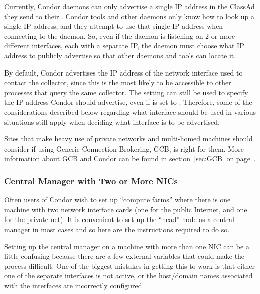 \begin{description}
  Currently, Condor daemons can only advertise a single IP address in
  the ClassAd they send to their .
  Condor tools and other daemons only know how to look up a single IP
  address, and they attempt to use that single IP address
  when connecting to the daemon.
  So, even if the daemon is listening on 2 or more different interfaces,
  each with a separate IP, the daemon must choose what IP address to
  publicly advertise so that other daemons and tools can locate it.

  By default, Condor advertises the IP address of the network interface
  used to contact the collector, since this is the most likely to be
  accessible to other processes that query the same collector.
  The  setting can still be used to
  specify the IP address Condor should advertise, even if
   is set to .
  Therefore, some of the considerations described below regarding what
  interface should be used in various situations still apply when
  deciding what interface is to be advertised.

\end{description}

Sites that make heavy use of private networks and multi-homed machines
should consider if using Generic Connection Brokering, GCB, is
right for them.
More information about GCB and Condor can be found in
section~\ref{sec:GCB} on page~\pageref{sec:GCB}.


\subsubsection{Central Manager with Two or More NICs}

Often users of Condor wish to set up ``compute farms'' where there is one
machine with two network interface cards (one for the public Internet,
and one for the private net). It is convenient to set up the ``head''
node as a central manager in most cases and so here are the instructions
required to do so.

Setting up the central manager on a machine with more than one NIC can
be a little confusing because there are a few external variables
that could make the process difficult. One of the biggest mistakes
in getting this to work is that either one of the separate interfaces is
not active, or the host/domain names associated with the interfaces are
incorrectly configured. 

